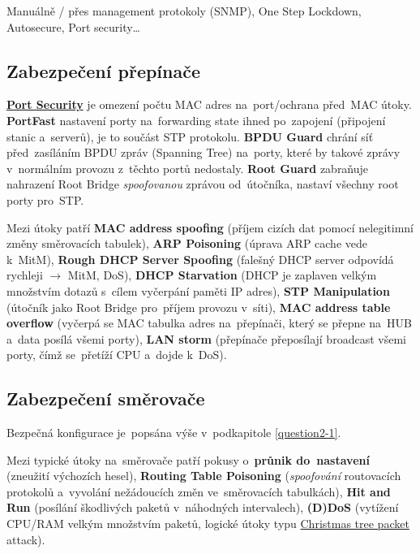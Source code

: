 Manuálně / přes management protokoly (SNMP), One Step Lockdown, Autosecure, Port security\dots

\subsection{Zabezpečení přepínače}

\textbf{\href{https://en.wikipedia.org/wiki/MAC_filtering}{Port Security}} je omezení počtu MAC adres na~port/ochrana před~MAC útoky. \textbf{PortFast} nastavení porty na~forwarding state ihned po~zapojení (připojení stanic a~serverů), je to součást STP protokolu. \textbf{BPDU Guard} chrání síť před~zasíláním BPDU zpráv (Spanning Tree) na~porty, které by takové zprávy v~normálním provozu z~těchto portů nedostaly. \textbf{Root Guard} zabraňuje nahrazení Root Bridge \emph{spoofovanou} zprávou od~útočníka, nastaví všechny root porty pro~STP.

Mezi útoky patří \textbf{MAC address spoofing} (příjem cizích dat pomocí nelegitimní změny směrovacích tabulek), \textbf{ARP Poisoning} (úprava ARP cache vede k~MitM), \textbf{Rough DHCP Server Spoofing} (falešný DHCP server odpovídá rychleji $\rightarrow$ MitM, DoS), \textbf{DHCP Starvation} (DHCP je zaplaven velkým množstvím dotazů s~cílem vyčerpání paměti IP adres), \textbf{STP Manipulation} (útočník jako Root Bridge pro~příjem provozu v~síti), \textbf{MAC address table overflow} (vyčerpá se MAC tabulka adres na~přepínači, který se přepne na~HUB a~data posílá všemi porty), \textbf{LAN storm} (přepínače přeposílají broadcast všemi porty, čímž se~přetíží CPU a~dojde k~DoS).

\subsection{Zabezpečení směrovače}

Bezpečná konfigurace je~popsána výše v~podkapitole \ref{question2-1}.

Mezi typické útoky na~směrovače patří pokusy o~\textbf{průnik do~nastavení} (zneužití výchozích hesel), \textbf{Routing Table Poisoning} (\emph{spoofování} routovacích protokolů a~vyvolání nežádoucích změn ve~směrovacích tabulkách), \textbf{Hit and Run} (posílání škodlivých paketů v~náhodných intervalech), \textbf{(D)DoS} (vytížení CPU/RAM velkým množstvím paketů, logické útoky typu \href{https://en.wikipedia.org/wiki/Christmas_tree_packet}{Christmas tree packet} attack).

